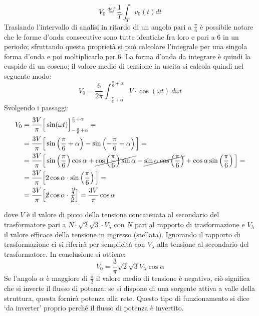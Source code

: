 \documentclass[a4paper,11pt]{article}
\begin{document}
\begin{equation}
 V_0 \stackrel{def}{=} \frac{1}{T}\int_T v_0(t) dt
 \label{eq:def_media_integrale}
\end{equation}
Traslando l'intervallo di analisi in ritardo di un angolo pari a \(\frac{\pi}{6}\) 
è possibile notare che le forme d'onda consecutive sono tutte identiche fra loro e pari %
a 6 in un periodo; sfruttando questa proprietà si può calcolare l'integrale per una singola forma d'onda e poi moltiplicarlo per 6.
La forma d'onda da integrare è quindi la cuspide di un coseno; il valore medio di 
tensione in uscita si calcola quindi nel seguente modo:
\begin{equation}
 V_0 = \frac{6}{2\pi} \int_{-\frac{\pi}{6}+\alpha}^{\frac{\pi}{6}+\alpha}
 V\cdot \cos (\omega t)\ d\omega t
\end{equation}
Svolgendo i passaggi:
\begin{align*}
 V_0 &= \frac{3V}{\pi} \Big[\sin(\omega t) \Big]_{-\frac{\pi}{6}+\alpha}^{\frac{\pi}{6}+\alpha} = \\
 &= \frac{3V}{\pi} \Big[\sin\left(\frac{\pi}{6}+\alpha \right) - \sin\left(-\frac{\pi}{6}+\alpha \right) \Big] = \\
 &=\frac{3V}{\pi}\Big[\sin\left(\frac{\pi}{6} \right)\cos\alpha + \cancel{\cos\left(\frac{\pi}{6}\right)\sin\alpha} - \cancel{\sin\alpha\cos\left(\frac{\pi}{6}\right)} + \cos\alpha\sin\left(\frac{\pi}{6}\right) \Big] = \\
 &= \frac{3V}{\pi} \Big[2\cos\alpha\cdot\sin\left(\frac{\pi}{6}\right) \Big]= \\
 &= \frac{3V}{\pi} \Big[\cancel{2}\cos\alpha\cdot\cancel{\frac{1}{2}}\Big] = \frac{3V}{\pi}\cos\alpha
\end{align*}
\medskip

dove \(V\) è il valore di picco della tensione concatenata al secondario del trasformatore
pari a \(N\cdot\sqrt2\sqrt3\cdot V_{\lambda} \) con \(N\) pari al rapporto di trasformazione
e \(V_{\lambda} \) il valore efficace della tensione in ingresso (stellata).
Ignorando il rapporto di trasformazione ci si riferirà per semplicità con \(V_{\lambda}\)
alla tensione al secondario del trasformatore.
In conclusione si ottiene:
\begin{equation}
 V_0 = \frac{3}{\pi} \sqrt{2} \sqrt{3} V_\lambda \cos\alpha
 \label{eq:valore_medio_tensione_ponte}
\end{equation}
Se l'angolo \(\alpha\) è maggiore di \(\frac{\pi}{2}\) il valore medio di tensione
è negativo, ciò significa che si inverte il flusso di potenza: se si dispone di una
sorgente attiva a valle della struttura, questa fornirà potenza alla rete. Questo 
tipo di funzionamento si dice `da inverter' proprio perché il flusso di potenza è invertito.
\end{document}
